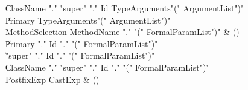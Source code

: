 \begin{bbgrammar}
    \| ClassName \xcd"." \xcd"super"  \xcd"." Id TypeArguments\opt \xcd"(" ArgumentList\opt \xcd")"\\
    \| Primary TypeArguments\opt \xcd"(" ArgumentList\opt \xcd")"\\
 MethodSelection  \label{prod:MethodSelection}  \: MethodName \xcd"." \xcd"(" FormalParamList\opt \xcd")" & ()\\
    \| Primary \xcd"." Id \xcd"." \xcd"(" FormalParamList\opt \xcd")"\\
    \| \xcd"super" \xcd"." Id \xcd"." \xcd"(" FormalParamList\opt \xcd")"\\
    \| ClassName \xcd"." \xcd"super"  \xcd"." Id \xcd"." \xcd"(" FormalParamList\opt \xcd")"\\
 PostfixExp  \label{prod:PostfixExp}  \: CastExp & ()\\
\end{bbgrammar}

